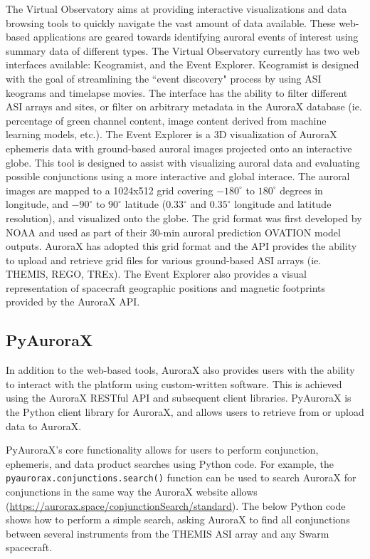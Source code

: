 \documentclass[utf8]{FrontiersinHarvard} %
\begin{document}
The Virtual Observatory aims at providing interactive visualizations and data browsing tools to quickly navigate the vast amount of data available. These web-based applications are geared towards identifying auroral events of interest using summary data of different types. The Virtual Observatory currently has two web interfaces available: Keogramist, and the Event Explorer. Keogramist is designed with the goal of streamlining the ``event discovery" process by using ASI keograms and timelapse movies. The interface has the ability to filter different ASI arrays and sites, or filter on arbitrary metadata in the AuroraX database (ie. percentage of green channel content, image content derived from machine learning models, etc.). The Event Explorer is a 3D visualization of AuroraX ephemeris data with ground-based auroral images projected onto an interactive globe. This tool is designed to assist with visualizing auroral data and evaluating possible conjunctions using a more interactive and global interace. The auroral images are mapped to a 1024x512 grid covering $-180^\circ$ to $180^\circ$ degrees in longitude, and $-90^\circ$ to $90^\circ$ latitude ($0.33^\circ$ and $0.35^\circ$ longitude and latitude resolution), and visualized onto the globe. The grid format was first developed by NOAA and used as part of their 30-min auroral prediction OVATION model outputs. AuroraX has adopted this grid format and the API provides the ability to upload and retrieve grid files for various ground-based ASI arrays (ie. THEMIS, REGO, TREx). The Event Explorer also provides a visual representation of spacecraft geographic positions and magnetic footprints provided by the AuroraX API.

\subsection{PyAuroraX}
In addition to the web-based tools, AuroraX also provides users with the ability to interact with the platform using custom-written software. This is achieved using the AuroraX RESTful API and subsequent client libraries. PyAuroraX is the Python client library for AuroraX, and allows users to retrieve from or upload data to AuroraX.

PyAuroraX's core functionality allows for users to perform conjunction, ephemeris, and data product searches using Python code. For example, the \verb|pyaurorax.conjunctions.search()| function can be used to search AuroraX for conjunctions in the same way the AuroraX website allows (\url{https://aurorax.space/conjunctionSearch/standard}). The below Python code shows how to perform a simple search, asking AuroraX to find all conjunctions between several instruments from the THEMIS ASI array and any Swarm spacecraft.
\end{document}
